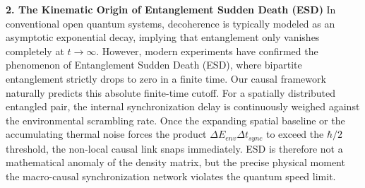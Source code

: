 \documentclass[11pt,a4paper]{article}
\begin{document}
\textbf{2. The Kinematic Origin of Entanglement Sudden Death (ESD)}
In conventional open quantum systems, decoherence is typically modeled as an asymptotic exponential decay, implying that entanglement only vanishes completely at $t \rightarrow \infty$. However, modern experiments have confirmed the phenomenon of Entanglement Sudden Death (ESD), where bipartite entanglement strictly drops to zero in a finite time. Our causal framework naturally predicts this absolute finite-time cutoff. For a spatially distributed entangled pair, the internal synchronization delay is continuously weighed against the environmental scrambling rate. Once the expanding spatial baseline or the accumulating thermal noise forces the product $\Delta E_{env} \Delta t_{sync}$ to exceed the $\hbar/2$ threshold, the non-local causal link snaps immediately. ESD is therefore not a mathematical anomaly of the density matrix, but the precise physical moment the macro-causal synchronization network violates the quantum speed limit.




\end{document}
